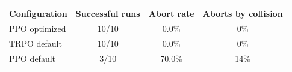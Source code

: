 \begin{tabular}{lccc}
\toprule
Configuration & Successful runs & Abort rate & Aborts by collision \\
\midrule
PPO optimized & 10/10 & 0.0\% & 0\% \\
TRPO default & 10/10 & 0.0\% & 0\% \\
PPO default & 3/10 & 70.0\% & 14\% \\
\bottomrule
\end{tabular}
